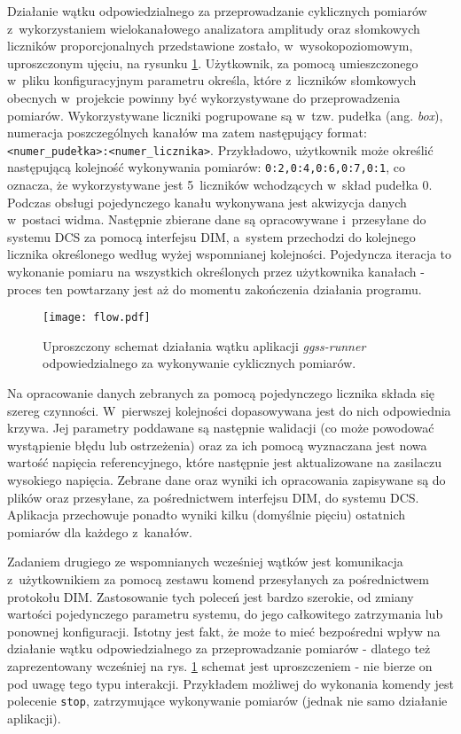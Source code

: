 Działanie wątku odpowiedzialnego za przeprowadzanie cyklicznych pomiarów z~wykorzystaniem wielokanałowego analizatora amplitudy oraz słomkowych liczników proporcjonalnych przedstawione zostało, w~wysokopoziomowym, uproszczonym ujęciu, na rysunku \ref{fig:flow_main}. Użytkownik, za pomocą umieszczonego w~pliku konfiguracyjnym parametru określa, które z~liczników słomkowych obecnych w~projekcie powinny być wykorzystywane do przeprowadzenia pomiarów. Wykorzystywane liczniki pogrupowane są w~tzw. pudełka (ang. \emph{box}), numeracja poszczególnych kanałów ma zatem następujący format: \lstinline{<numer_pudełka>:<numer_licznika>}. Przykładowo, użytkownik może określić następującą kolejność wykonywania pomiarów: \lstinline{0:2,0:4,0:6,0:7,0:1}, co oznacza, że wykorzystywane jest 5~liczników wchodzących w~skład pudełka 0. Podczas obsługi pojedynczego kanału wykonywana jest akwizycja danych w~postaci widma. Następnie zbierane dane są opracowywane i~przesyłane do systemu DCS za pomocą interfejsu DIM, a~system przechodzi do kolejnego licznika określonego według wyżej wspomnianej kolejności. Pojedyncza iteracja to wykonanie pomiaru na wszystkich określonych przez użytkownika kanałach - proces ten powtarzany jest aż do momentu zakończenia działania programu.


\begin{figure}[H]
\centering
\texttt{[image: flow.pdf]}
\caption{Uproszczony schemat działania wątku aplikacji \emph{ggss-runner} odpowiedzialnego za wykonywanie cyklicznych pomiarów.}
\label{fig:flow_main}
\end{figure}

Na opracowanie danych zebranych za pomocą pojedynczego licznika składa się szereg czynności. W~pierwszej kolejności dopasowywana jest do nich odpowiednia krzywa. Jej parametry poddawane są następnie walidacji (co może powodować wystąpienie błędu lub ostrzeżenia) oraz za ich pomocą wyznaczana jest nowa wartość napięcia referencyjnego, które następnie jest aktualizowane na zasilaczu wysokiego napięcia. Zebrane dane oraz wyniki ich opracowania zapisywane są do plików oraz przesyłane, za pośrednictwem interfejsu DIM, do systemu DCS. Aplikacja przechowuje ponadto wyniki kilku (domyślnie pięciu) ostatnich pomiarów dla każdego z~kanałów.

Zadaniem drugiego ze wspomnianych wcześniej wątków jest komunikacja z~użytkownikiem za pomocą zestawu komend przesyłanych za pośrednictwem protokołu DIM. Zastosowanie tych poleceń jest bardzo szerokie, od zmiany wartości pojedynczego parametru systemu, do jego całkowitego zatrzymania lub ponownej konfiguracji. Istotny jest fakt, że może to mieć bezpośredni wpływ na działanie wątku odpowiedzialnego za przeprowadzanie pomiarów - dlatego też zaprezentowany wcześniej na rys. \ref{fig:flow_main} schemat jest uproszczeniem - nie bierze on pod uwagę tego typu interakcji. Przykładem możliwej do wykonania komendy jest polecenie \lstinline{stop}, zatrzymujące wykonywanie pomiarów (jednak nie samo działanie aplikacji).

